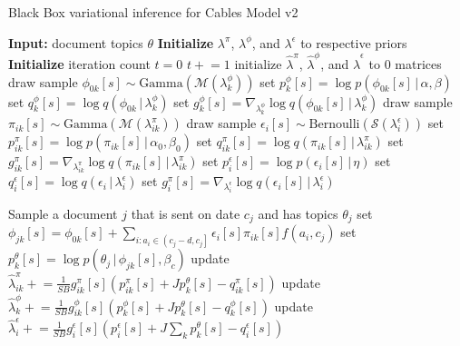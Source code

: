 \documentclass{article}
\newcommand{\pluseq}{\mathrel{+}=}
\newcommand{\g}{\, | \,}
\begin{document}
\begin{algorithm}[h]
\small
\caption{Black Box variational inference for Cables Model v2}
\label{alg:SPF}
\begin{algorithmic}[1]
\State \textbf{Input:} document topics $\theta$
\State \textbf{Initialize} $\lambda^\pi$, $\lambda^\phi$, and $\lambda^\epsilon$ to respective priors
\State \textbf{Initialize} iteration count $t = 0$
\Repeat
	\State $t \pluseq 1$
	\State initialize $\hat\lambda^{\pi}$, $\hat\lambda^{\phi}$, and $\hat\lambda^{\epsilon}$ to 0 matrices
			\State draw sample $\phi_{0k}[s] \sim \mbox{Gamma}(\mathcal{M}(\lambda^\phi_{k}))$
			\State set $p^\phi_k[s] = \log p(\phi_{0k}[s] \g \alpha, \beta)$  
			\State set $q^\phi_k[s] = \log q(\phi_{0k} \g \lambda^\phi_k)$ 
			\State set $g^\phi_k[s] = \nabla_{\lambda^\phi_{k}} \log q(\phi_{0k}[s] \g \lambda^\phi_{k})$  
			\For {each event $i$ on date $a_i \in \left( c_j - d, c_j \right]$}
				\State draw sample $\pi_{ik}[s] \sim \mbox{Gamma}(\mathcal{M}(\lambda^\pi_{ik}))$
				\State draw sample $\epsilon_i[s] \sim \mbox{Bernoulli}(\mathcal{S}(\lambda^\epsilon_i))$
				\State set $p^\pi_{ik}[s] = \log p(\pi_{ik}[s] \g \alpha_0, \beta_0)$  
				\State set $q^\pi_{ik}[s] = \log q(\pi_{ik}[s] \g \lambda^\pi_{ik})$
				\State set $g^\pi_{ik}[s] = \nabla_{\lambda^\pi_{ik}} \log q(\pi_{ik}[s] \g \lambda^\pi_{ik})$
			\EndFor
		\EndFor
			\State set $p^\epsilon_i[s] = \log p(\epsilon_{i}[s] \g \eta)$ 
			\State set $q^\epsilon_i[s] = \log q(\epsilon_i \g \lambda^\epsilon_i)$ 
			\State set $g^\pi_{i}[s] = \nabla_{\lambda^\epsilon_{i}} \log q(\epsilon_{i}[s] \g \lambda^\epsilon_{i})$
		\EndFor
		
				\State Sample a document $j$ that is sent on date $c_j$ and has topics $\theta_j$
				\State set $\phi_{jk}[s] = \phi_{0k}[s] + \sum_{i : a_i \in \left( c_j - d, c_j \right]}\epsilon_i[s] \pi_{ik}[s] f(a_i, c_j)$
				\State set $p^\theta_k[s] = \log p(\theta_j \g \phi_{jk}[s], \beta_c)$
					\State update $\hat\lambda^{\pi}_{ik} \pluseq \frac{1}{SB} g^\pi_{ik}[s] ( p^\pi_{ik}[s] + J p^\theta_k[s] -  q^\pi_{ik}[s] ) $
				\EndFor
				\State update $\hat\lambda^{\phi}_{k} \pluseq \frac{1}{SB} g^\phi_{ik}[s] ( p^\phi_{k}[s] + J p^\theta_k[s] -  q^\phi_{k}[s] ) $
			\EndFor
				\State update $\hat\lambda^{\epsilon}_{i} \pluseq \frac{1}{SB} g^\epsilon_{i}[s] ( p^\epsilon_{i}[s] + J \sum_k p^\theta_k[s] -  q^\epsilon_{i}[s] ) $
			\EndFor
			

\end{algorithmic}
\end{algorithm}
\end{document}
